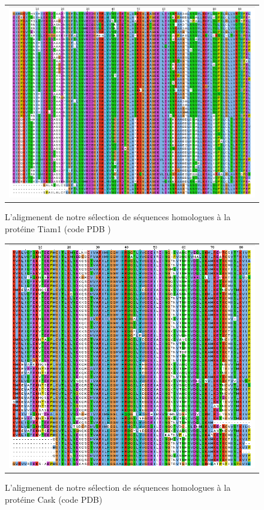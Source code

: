    \begin{figure}[t]
     \centering
     \begin{tabular}{c}
       \includegraphics[width=17cm]{homologues/TIAM1.png} \\
     \end{tabular}
     \caption{L'aligmenent de notre sélection de séquences homologues à la protéine Tiam1 (code PDB )}
\label{align_homo:Tiam1}
   \end{figure}
\clearpage   
   \begin{figure}[t]
     \centering
     \begin{tabular}{c}
       \includegraphics[width=17cm]{homologues/CASK.png} \\
     \end{tabular}
     \caption{L'aligmenent de notre sélection de séquences homologues à la protéine Cask (code PDB)}
   \label{align_homo:CASK}
   \end{figure}
   
